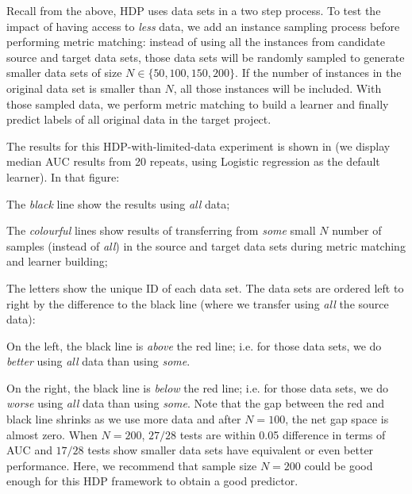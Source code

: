 Recall from the above,
HDP uses  data sets  in a two step process.
To test the impact of having access to {\em less} data,
we  add an instance sampling process before performing metric matching:
instead of using all the instances from
candidate source and target data sets, those data sets will
be randomly sampled to generate smaller data sets of
size $N \in \{50, 100, 150, 200\}$. If
the number of instances in the original data set is
smaller than $N$, all those instances will be
included. With those sampled data, we perform metric matching to build a learner
and finally predict labels of all original data in the target project.

The results for this HDP-with-limited-data experiment is shown in 
(we display median AUC results from 20 repeats, using  Logistic regression
as the default learner). 
In that figure:
\bi
\item
  The {\em black} line show the results using {\em all} data;
\item
  The {\em colourful} lines show results of transferring from {\em some} small $N$ number of samples (instead of {\em all})
  in the source and target data sets during metric matching and learner building;
\item
  The letters show the unique ID of each data set.
\ei
The data sets are ordered left to right by the difference to the black line (where we transfer using {\em
  all} the source data):
\bi
\item
  On the left, the black line is
  {\em above} the red line; i.e. for those data sets, we do {\em better} using
  {\em all} data than using {\em some}.
  \item
On the right, the black line is {\em below} the red
line; i.e. for those data sets, we do {\em worse}
using {\em all} data than using {\em some}.  \ei
Note that the gap between the red and black line
shrinks as we use more data and after $N=100$, the
net gap space is almost zero.  When $N=200$, $27/28$
tests are within 0.05 difference in terms of AUC and
$17/28$ tests show smaller data sets have equivalent
or even better performance. Here, we recommend that
sample size $N=200$ could be good enough for this
HDP framework to obtain a good predictor.



